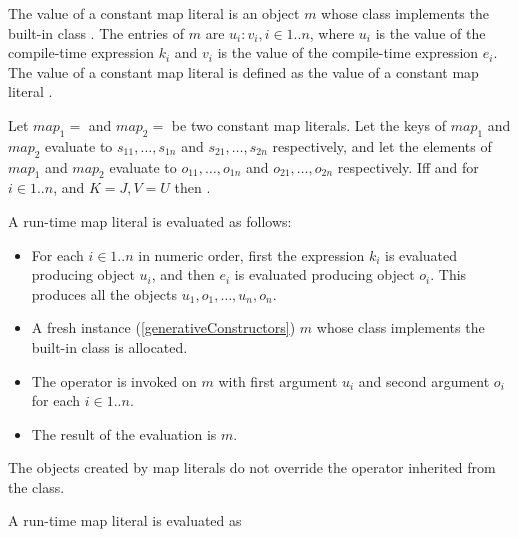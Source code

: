 \documentclass[makeidx]{article}
\begin{document}
\LMHash{}%
The value of a constant map literal
is an object $m$ whose class implements the built-in class
.
The entries of $m$ are $u_i:v_i, i \in 1 .. n$, where $u_i$ is the value of the compile-time expression $k_i$ and $v_i$ is the value of the compile-time expression $e_i$.
The value of a constant map literal
is defined as the value of a constant map literal
.

\LMHash{}%
Let
$map_1 =$ 
and
$map_2 =$ 
be two constant map literals.
Let the keys of $map_1$ and $map_2$ evaluate to $s_{11}, \ldots, s_{1n}$ and $s_{21}, \ldots, s_{2n}$ respectively, and let the elements of $map_1$ and $map_2$ evaluate to $o_{11}, \ldots, o_{1n}$ and $o_{21}, \ldots, o_{2n}$ respectively.
If{}f  and  for $i \in 1 .. n$, and $K = J, V = U$ then .


\LMHash{}%
A run-time map literal
is evaluated as follows:
\begin{itemize}
\item
For each $i \in 1 .. n$ in numeric order,
first the expression $k_i$ is evaluated producing object $u_i$,
and then $e_i$ is evaluated producing object $o_i$.
This produces all the objects $u_1, o_1, \ldots, u_n, o_n$.
\item A fresh instance (\ref{generativeConstructors}) $m$ whose class implements the built-in class
 is allocated.
\item
The operator  is invoked on $m$ with first argument $u_i$ and second argument $o_i$ for each $i \in 1 .. n$.
\item
The result of the evaluation is $m$.
\end{itemize}

\LMHash{}%
The objects created by map literals do not override
the \code{==} operator inherited from the  class.

\LMHash{}%
A run-time map literal
is evaluated as
\end{document}
